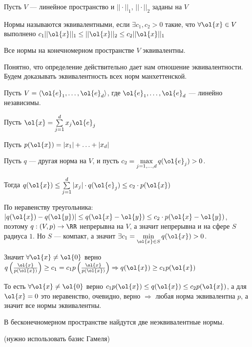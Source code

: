 \begin{defn}{}{}

    Пусть \( V \) --- линейное пространство и \( || \cdot ||_1 \), \( || \cdot ||_2 \) заданы на \( V \)

    Нормы называются эквивалентными, если \( \exists c_1, c_2 > 0 \) такие,
    что \( \forall \ol{x} \in V \) выполнено
    \(
        c_1 || \ol{x} ||_1 \leq || \ol{x} ||_2 \leq c_2 || \ol{x} ||_1
    \)
\end{defn}

\begin{thrm}{}{}
    Все нормы на конечномерном пространстве \( V \) эквивалентны.
\end{thrm}

Понятно, что определение действительно дает нам отношение эквивалентности.
Будем доказывать эквивалентность всех норм манхеттенской.

Пусть \( V = \langle \ol{e}_1, \ldots, \ol{e}_d \rangle \),
где \( \ol{e}_1, \ldots, \ol{e}_d \) --- линейно независимы.

Пусть \( \ol{x} = \sum\limits_{j = 1}^d x_j \ol{e}_j \)

Пусть \( p(\ol{x}) = |x_1| + \ldots + |x_d| \)

Пусть \( q \) --- другая норма на \( V \), и пусть \( c_2 = \max\limits_{j = 1, \ldots, d} q(\ol{e}_j) > 0 \).

Тогда \( q(\ol{x}) \leq \sum\limits_{j = 1}^{d} |x_j| \cdot q(\ol{e}_j) \leq c_2 \cdot p(\ol{x}) \)

По неравенству треугольника:
\( | q(\ol{x}) - q(\ol{y}) | \leq q(\ol{x} - \ol{y}) \leq c_2 \cdot p(\ol{x} - \ol{y}) \),
поэтому \( q : (V, p) \to \RR \) непрерывна на \( V \),
а значит непрерывна и на сфере \( S \) радиуса \( 1 \).
Но \( S \) --- компакт, а значит \( \exists c_1 = \min\limits_{\ol{x} \in S} q(\ol{x}) > 0 \).

Значит \( \forall \ol{x} \neq \ol{0} \) верно
\(
    q \left( \frac{\ol{x}}{p(\ol{x})} \right) \geq c_1 = c_1 p \left( \frac{\ol{x}}{p(\ol{x})} \right)
    \Rightarrow
    q ( \ol{x} ) \geq c_1 p ( \ol{x} )
\)

То есть \( \forall \ol{x} \neq \ol{0} \) верно \( c_1 p(\ol{x}) \leq q(\ol{x}) \leq c_2 p(\ol{x}) \),
а для \( \ol{x} = 0 \) это неравенство, очевидно, верно \( \Rightarrow \)
любая норма эквивалентна \( p \), а значит все нормы эквивалентны.

\begin{exercise}{}{}
    В бесконечномерном пространстве найдутся две неэквивалентные нормы.

    (нужно использовать базис Гамеля)
\end{exercise}

